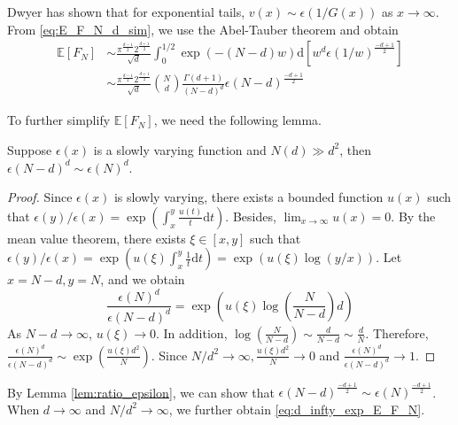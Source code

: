 \documentclass{aptpub}
\def\E{\mathbb{E}}
\def\d{\mathrm{d}}
\begin{document}
Dwyer \cite{dwyer1991convex} has shown that for exponential tails, $v(x) \sim \epsilon(1/G(x))$ as $x\to \infty$.
From \eqref{eq:E_F_N_d_sim},
we use the Abel-Tauber theorem
\cite{omey1989abelian} and obtain
\begin{align*}
    \E[F_N] & \sim \frac{\pi^{\frac{d-1}{2}} 2^{\frac{d+1}{2}}}{\sqrt{d}}\int_0^{1/2} \exp(-(N-d)w) \d [w^d \epsilon(1/w)^{\frac{-d+1}{2}}] \\
    &\sim \frac{\pi^{\frac{d-1}{2}} 2^{\frac{d+1}{2}}}{\sqrt{d}} \binom{N}{d}\frac{\Gamma(d+1)}{(N-d)^d} \epsilon(N-d)^{\frac{-d+1}{2}}
\end{align*}

To further simplify $\E[F_N]$, we need the following lemma.
\begin{lemma}\label{lem:ratio_epsilon}
     Suppose $\epsilon(x)$ is a slowly varying function
     and $N(d)\gg d^2$,
     then $\epsilon(N-d)^{d} \sim \epsilon(N)^d$.
\end{lemma}
\begin{proof}
     Since $\epsilon(x)$ is slowly varying, there exists
     a bounded function $u(x)$ such that
     $\epsilon(y)/\epsilon(x)=\exp(\int_{x}^y \frac{u(t)}{t}\d t)$.
     Besides, $\lim_{x\to \infty} u(x) = 0$.
     By the mean value theorem, there exists $\xi \in [x,y]$ such that
     $\epsilon(y)/\epsilon(x)=\exp(u(\xi)\int_{x}^y \frac{1}{t}\d t)
     =\exp(u(\xi)\log(y/x))$. Let $x=N-d, y=N$, and we obtain
     \begin{equation*}
          \frac{\epsilon(N)^d}{\epsilon(N-d)^d}
          = \exp \left(u(\xi) \log\left(\frac{N}{N-d} \right)d \right)
     \end{equation*}
     As $N-d\to \infty$, $u(\xi)\to 0$. In addition,
     $\log(\frac{N}{N-d}) \sim \frac{d}{N-d} \sim \frac{d}{N}$.
     Therefore,
     $\frac{\epsilon(N)^d}{\epsilon(N-d)^d}\sim \exp(\frac{u(\xi)d^2}{N})
     $. Since $N/d^2 \to \infty, \frac{u(\xi)d^2}{N} \to 0$ and
     $\frac{\epsilon(N)^d}{\epsilon(N-d)^d}\to 1$.
\end{proof}
By Lemma \ref{lem:ratio_epsilon}, we can show that
$\epsilon(N-d)^{\frac{-d+1}{2}}\sim \epsilon(N)^{\frac{-d+1}{2}}$.
When $d\to\infty$ and $N/d^2\to \infty$, we further obtain \eqref{eq:d_infty_exp_E_F_N}.
 
\end{document}
